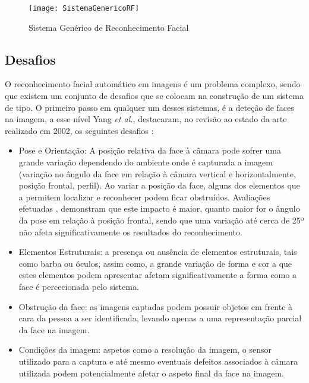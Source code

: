\begin{figure}[ht]
  \begin{center}
    \leavevmode
    \texttt{[image: SistemaGenericoRF]}
    \caption{Sistema Genérico de Reconhecimento Facial}
    \label{fig:genericRF}
  \end{center}
\end{figure}

\subsection{Desafios} \label{desafios}
O reconhecimento facial automático em imagens é um problema complexo, sendo que existem um conjunto de desafios que se colocam na construção de um sistema de tipo. O primeiro passo em qualquer um desses sistemas, é a deteção de faces na imagem, a esse nível Yang \textit{et al.}, destacaram, no revisão ao estado da arte realizado em 2002,  os seguintes desafios \citep{Yang2002}:
\begin{itemize}
\item Pose e Orientação: A posição relativa da face à câmara pode sofrer uma grande variação dependendo do ambiente onde é capturada a imagem (variação no ângulo da face em relação à câmara vertical e horizontalmente, posição frontal, perfil). Ao variar a posição da face, alguns dos elementos que a permitem localizar e reconhecer podem ficar obstruídos. Avaliações efetuadas \citep{BlackburnDuaneM.;BoneMike;Phillips2001}, demonstram que este impacto é maior, quanto maior for o ângulo da pose em relação à posição frontal, sendo que uma variação até cerca de 25º não afeta significativamente os resultados do reconhecimento.
\item  Elementos Estruturais: a presença ou ausência de elementos estruturais, tais como barba ou óculos, assim como, a grande variação de forma e cor a que estes elementos podem apresentar afetam significativamente a forma como a face é percecionada pelo sistema.
\item Obstrução da face: as imagens captadas podem possuir objetos em frente à cara da pessoa a ser identificada, levando apenas a uma representação parcial da face na imagem.
\item Condições da imagem: aspetos como a resolução da imagem, o sensor utilizado para a captura e até mesmo eventuais defeitos associados à câmara utilizada podem potencialmente afetar o aspeto final da face na imagem.
\end{itemize}

